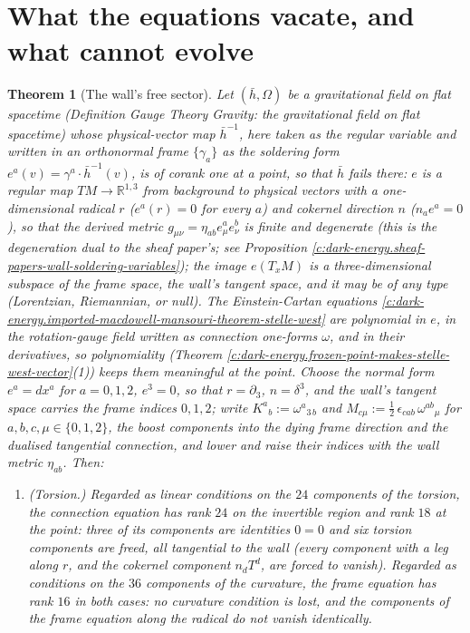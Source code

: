 \documentclass[11pt]{article}
\newtheorem{theorem}{Theorem}[section]
\theoremstyle{definition}
\theoremstyle{plain}
\newcommand{\changedmark}[2]{\marginpar{\raggedright\scriptsize\color{#1}#2}}
\providecommand{\hb}{}\renewcommand{\hb}{\bar{h}}
\begin{document}
\section{What the equations vacate, and what cannot evolve}

\begin{theorem}[The wall's free sector]\label{c:dark-energy.walls-free-sector}
\changedmark{gray}{reworded}
Let $(\hb, \Omega)$ be a gravitational field on flat spacetime (Definition \emph{Gauge Theory Gravity: the gravitational field on flat spacetime}) whose physical-vector map $\hb^{-1}$, here taken as the regular variable and written in an orthonormal frame $\{\gamma_a\}$ as the soldering form $e^a(v) = \gamma^a \cdot \hb^{-1}(v)$, is of corank one at a point, so that $\hb$ fails there: $e$ is a regular map $TM \to \mathbb{R}^{1,3}$ from background to physical vectors with a one-dimensional radical $r$ ($e^a(r) = 0$ for every $a$) and cokernel direction $n$ ($n_a e^a = 0$), so that the derived metric $g_{\mu\nu} = \eta_{ab}e^a_\mu e^b_\nu$ is finite and degenerate (this is the degeneration dual to the sheaf paper's; see Proposition \ref{c:dark-energy.sheaf-papers-wall-soldering-variables}); the image $e(T_xM)$ is a three-dimensional subspace of the frame space, the wall's tangent space, and it may be of any type (Lorentzian, Riemannian, or null). The Einstein-Cartan equations \ref{c:dark-energy.imported-macdowell-mansouri-theorem-stelle-west} are polynomial in $e$, in the rotation-gauge field written as connection one-forms $\omega$, and in their derivatives, so polynomiality (Theorem \ref{c:dark-energy.frozen-point-makes-stelle-west-vector}(1)) keeps them meaningful at the point. Choose the normal form $e^a = dx^a$ for $a = 0,1,2$, $e^3 = 0$, so that $r = \partial_3$, $n = \delta^3$, and the wall's tangent space carries the frame indices $0,1,2$; write $K^{a}{}_{b} := \omega^{a}{}_{3\,b}$ and $M_{c\mu} := \tfrac12\,\epsilon_{cab}\,\omega^{ab}{}_{\mu}$ for $a, b, c, \mu \in \{0,1,2\}$, the boost components into the dying frame direction and the dualised tangential connection, and lower and raise their indices with the wall metric $\eta_{ab}$. Then:
\begin{enumerate}
\item[(a)] \emph{(Torsion.)} Regarded as linear conditions on the $24$ components of the torsion, the connection equation has rank $24$ on the invertible region and rank $18$ at the point: three of its components are identities $0 = 0$ and six torsion components are freed, all tangential to the wall (every component with a leg along $r$, and the cokernel component $n_dT^d$, are forced to vanish). Regarded as conditions on the $36$ components of the curvature, the frame equation has rank $16$ in both cases: no curvature condition is lost, and the components of the frame equation along the radical do \emph{not} vanish identically.

\end{enumerate}
\end{theorem}
\end{document}
